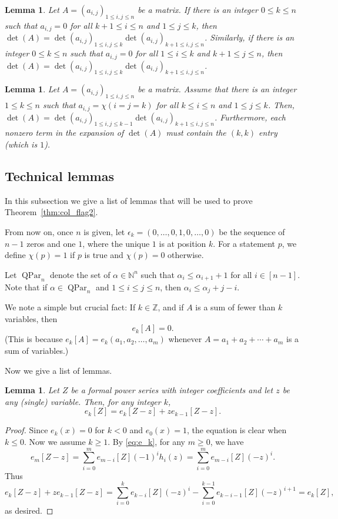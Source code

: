 \documentclass[12pt]{amsart}
\numberwithin{equation}{section}
\newtheorem{lem}[thm]{Lemma}
\theoremstyle{definition}
\newcommand\ZZ{\mathbb{Z}}
\newcommand\NN{\mathbb{N}}
\newcommand\QPar{\operatorname{QPar}}
\begin{document}
\begin{lem}\label{lem:det=detdet}
  Let $A=(a_{i,j})_{1\le i,j\le n}$ be a matrix. If there is an integer $0\le
  k\le n$ such that $a_{i,j}=0$ for all $k+1\le i\le n$ and $1\le j\le k$, then
  $\det(A)= \det (a_{i,j})_{1\le i,j\le k} \det (a_{i,j})_{k+1\le i,j\le n}$.
  Similarly, if there is an integer $0\le k\le n$ such that
  $a_{i,j}=0$ for all $1\le i\le k$ and $k+1\le j\le n$, then
  $\det(A)= \det (a_{i,j})_{1\le i,j\le k} \det (a_{i,j})_{k+1\le i,j\le n}$.
\end{lem}

\begin{lem}\label{lem:det=det1det}
  Let $A=(a_{i,j})_{1\le i,j\le n}$ be a matrix. Assume that there is
  an integer $1 \le k\le n$ such that $a_{i,j}= \chi(i=j=k)$ for all
  $k\le i\le n$ and $1\le j\le k$. Then,
  $\det(A)= \det (a_{i,j})_{1\le i,j\le k-1} \det (a_{i,j})_{k+1\le i,j\le n}$.
  Furthermore, each nonzero term in the expansion of $\det(A)$
  must contain the $(k,k)$ entry (which is $1$).
\end{lem}


\subsection{Technical lemmas}
\label{sec:technical-lemmas}

In this subsection we give a list of lemmas that will be used to prove
Theorem~\ref{thm:col_flag2}.

From now on, once $n$ is given, let $\epsilon_k=(0,\dots,0,1,0,\dots,0)$ be the
sequence of $n-1$ zeros and one $1$, where the unique $1$ is at position $k$.
For a statement $p$, we define $\chi(p)=1$ if $p$ is true and $\chi(p)=0$
otherwise.

Let $\QPar_n$ denote the set of $\alpha\in\NN^n$ such that $\alpha_i\le
\alpha_{i+1}+1$ for all $i\in[n-1]$. Note that if $\alpha\in\QPar_n$ and $1\le
i\le j\le n$, then $\alpha_i\le \alpha_j +j-i$.

We note a simple but crucial fact:
If $k \in \ZZ$, and if $A$ is a sum of fewer than $k$ variables,
then
\begin{equation}
\label{eq:ekA=0}
e_k[A] = 0.
\end{equation}
(This is because $e_k[A] = e_k\left(a_1, a_2, \ldots, a_m\right)$
whenever $A = a_1 + a_2 + \cdots + a_m$ is a sum of variables.)


Now we give a list of lemmas.


\begin{lem}\label{lem:e_k[Z]}
  Let $Z$ be a formal power series with integer coefficients and let $z$ be any
  (single) variable. Then, for any integer $k$,
  \[
e_k[Z] = e_k[Z-z] + z e_{k-1}[Z-z].
  \]
\end{lem}
\begin{proof}
  Since $e_k(x)=0$ for $k<0$ and $e_0(x)=1$, the equation is clear when $k\le
  0$. Now we assume $k\ge1$. By \eqref{eq:e_k}, for any $m\ge0$, we have
  \[
e_m[Z-z] = \sum_{i=0}^m e_{m-i}[Z](-1)^ih_i(z)=\sum_{i=0}^m e_{m-i}[Z](-z)^i.
  \]
  Thus
  \[
    e_k[Z-z] + z e_{k-1}[Z-z] = \sum_{i=0}^k e_{k-i}[Z](-z)^i
    -\sum_{i=0}^{k-1} e_{k-i-1}[Z](-z)^{i+1} = e_k[Z],
  \]
  as desired.
\end{proof}
\end{document}

